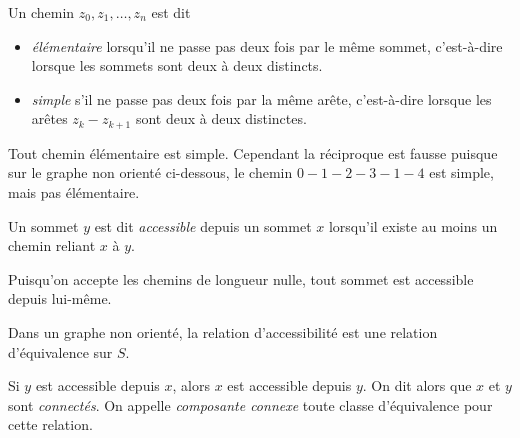 \documentclass{magnolia}
\begin{document}
\begin{definition}
Un chemin $z_0,z_1,\ldots,z_n$ est dit
\begin{itemize}
\item \emph{élémentaire} lorsqu'il ne passe pas deux fois par le même sommet, c'est-à-dire
  lorsque les sommets sont deux à deux distincts.
\item \emph{simple} s'il ne passe pas deux fois par la même arête, c'est-à-dire lorsque
  les arêtes $z_k - z_{k+1}$ sont deux à deux distinctes.
\end{itemize}
\end{definition}

\begin{remarqueUnique}
\remarque Tout chemin élémentaire est simple. Cependant la réciproque est fausse puisque
sur le graphe non orienté ci-dessous, le chemin $0-1-2-3-1-4$ est simple, mais pas
élémentaire.
\begin{center}
\end{center}
\end{remarqueUnique}

\begin{definition}
Un sommet $y$ est dit \emph{accessible}
depuis un sommet $x$ lorsqu'il existe au moins un chemin
reliant $x$ à $y$.
\end{definition}

\begin{remarqueUnique}
\remarque Puisqu'on accepte les chemins de longueur nulle, tout sommet est
  accessible depuis lui-même.
\end{remarqueUnique}

\begin{proposition}
Dans un graphe non orienté, la relation d'accessibilité est une relation d'équivalence
sur $S$. 
\end{proposition}

\begin{remarques}
\remarque Si $y$ est accessible depuis $x$, alors $x$ est
  accessible depuis $y$. On dit alors que $x$ et $y$ sont \emph{connectés}.
\remarque On appelle \emph{composante connexe} toute classe d'équivalence
pour cette relation.
\end{remarques}
\end{document}
